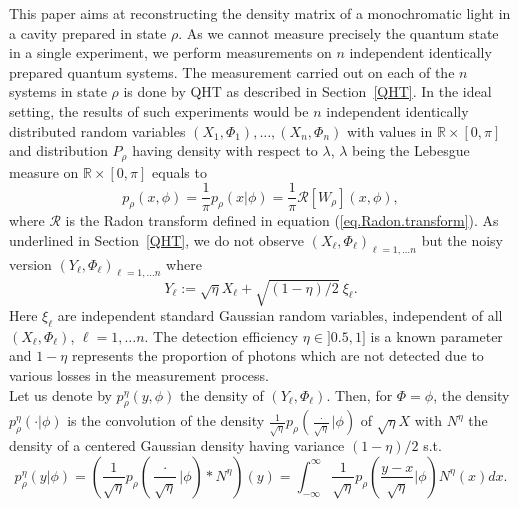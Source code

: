 \documentclass[a4paper]{amsart}
\begin{document}
This paper aims at  reconstructing the density matrix of  a monochromatic light
in a cavity prepared in state $\rho$. As we cannot measure precisely the quantum
state in a single experiment, we perform measurements on $n$ independent
identically prepared quantum systems. The measurement
carried out on each of the $n$ systems in state $\rho$ is done by QHT as
described in Section~\ref{QHT}. In the ideal setting, the results of such
experiments would be $n$  independent identically
distributed random variables $(X_{1}, \Phi_{1}),\dots ,(X_{n}, \Phi_{n})$  with
values in $\mathbb{R}\times [0,\pi]$ and distribution $P_{\rho}$ having density 
with respect to $\lambda$, $\lambda$ being the Lebesgue measure on
$\mathbb{R}\times [0,\pi]$ equals to
%
      \begin{equation}
      \label{eq:prhophi}
     p_{\rho}(x,\phi)=\frac 1\pi   p_{\rho}(x|\phi) =\frac 1\pi
\mathcal{R}[W_{\rho}] (x,\phi),
       \end{equation}
%    
where $\mathcal{R}$ is the Radon transform defined in equation
(\ref{eq.Radon.transform}).
As underlined in Section~\ref{QHT},  we do not observe $(X_{\ell},
\Phi_{\ell})_{\ell=1,\ldots n}$ but the noisy version $(Y_{\ell},
\Phi_{\ell})_{\ell=1,\ldots n}$  where
%
      \begin{equation}
      \label{noisy.data}
       Y_\ell:=\sqrt{\eta}X_\ell+\sqrt{(1-\eta)/2}~\xi_\ell.
      \end{equation}
%
Here $\xi_\ell$ are independent standard Gaussian random variables, independent
of all $(X_{\ell}, \Phi_{\ell})$, $\ell=1,\ldots n$. The detection efficiency
$\eta\in]0.5,1]$ is a known parameter and $1-\eta$  represents the proportion of
photons which are not detected due to various losses in the measurement process.
\\
%
Let us denote by $p_{\rho}^{\eta}(y,\phi)$ the density of $(Y_{\ell},
\Phi_{\ell})$. Then,  for $\Phi=\phi$, the density $p_{\rho}^{\eta}(\cdot|\phi)$
is the convolution of the density 
$\frac{1}{\sqrt{\eta}}p_\rho(\frac{\cdot}{\sqrt{\eta}}| \phi)$ of $\sqrt{\eta}X$
with $N^\eta$ the density of a centered Gaussian density having variance $(1
-\eta)/2$ s.t.
%      
       \begin{equation}
       \label{densitbrui}
        p^\eta_\rho(y|\phi) = \left(\frac{1}{\sqrt\eta}
p_\rho\left(\frac{\cdot}{\sqrt\eta}|\phi\right) \ast N^\eta\right)(y)
        = \int_{-\infty}^\infty \frac{1}{\sqrt{\eta}}
p_\rho\left(\frac{y-x}{\sqrt{\eta}}|\phi
        \right) N^\eta (x)dx.%
        \end{equation}
\end{document}
